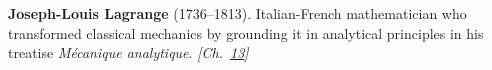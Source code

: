 \textbf{Joseph-Louis Lagrange} (1736–1813). Italian-French mathematician who transformed classical mechanics by grounding it in analytical principles in his treatise \emph{M\'{e}canique analytique}. \emph{[Ch.~\hyperref[ch:poissonsspot]{13}]}

